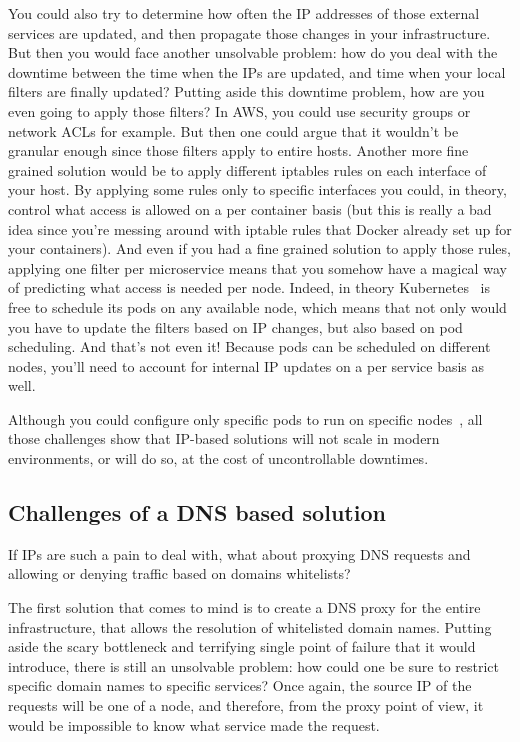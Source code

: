 You could also try to determine how often the IP addresses of those external services are updated, and then propagate those changes in your infrastructure. But then you would face another unsolvable problem: how do you deal with the downtime between the time when the IPs are updated, and time when your local filters are finally updated? Putting aside this downtime problem, how are you even going to apply those filters? In AWS, you could use security groups or network ACLs for example. But then one could argue that it wouldn’t be granular enough since those filters apply to entire hosts. Another more fine grained solution would be to apply different iptables rules on each interface of your host. By applying some rules only to specific interfaces you could, in theory, control what access is allowed on a per container basis (but this is really a bad idea since you’re messing around with iptable rules that Docker already set up for your containers). And even if you had a fine grained solution to apply those rules, applying one filter per microservice means that you somehow have a magical way of predicting what access is needed per node. Indeed, in theory Kubernetes~\cite{ProcessLevelNetworkSecurityMonitoring:JohnArundelJustinDomingus} is free to schedule its pods on any available node, which means that not only would you have to update the filters based on IP changes, but also based on pod scheduling. And that’s not even it! Because pods can be scheduled on different nodes, you’ll need to account for internal IP updates on a per service basis as well.

Although you could configure only specific pods to run on specific nodes~\cite{ProcessLevelNetworkSecurityMonitoring:StefanSchimanskiMichaelHausenblas}, all those challenges show that IP-based solutions will not scale in modern environments, or will do so, at the cost of uncontrollable downtimes.

\subsection{Challenges of a DNS based solution}

If IPs are such a pain to deal with, what about proxying DNS requests and allowing or denying traffic based on domains whitelists?

The first solution that comes to mind is to create a DNS proxy for the entire infrastructure, that allows the resolution of whitelisted domain names. Putting aside the scary bottleneck and terrifying single point of failure that it would introduce, there is still an unsolvable problem: how could one be sure to restrict specific domain names to specific services? Once again, the source IP of the requests will be one of a node, and therefore, from the proxy point of view, it would be impossible to know what service made the request.

